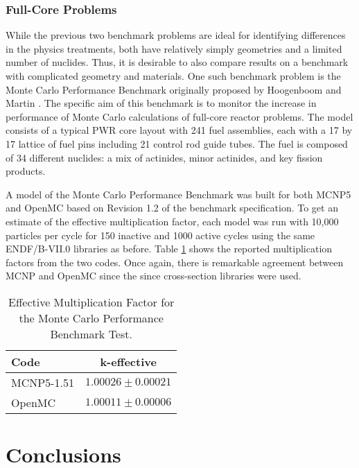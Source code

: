 \documentclass{elsarticle}
\begin{document}
\subsubsection{Full-Core Problems}

While the previous two benchmark problems are ideal for identifying differences
in the physics treatments, both have relatively simply geometries and a limited
number of nuclides. Thus, it is desirable to also compare results on a benchmark
with complicated geometry and materials. One such benchmark problem is the Monte
Carlo Performance Benchmark originally proposed by Hoogenboom and Martin
\cite{hoogenboom}. The specific aim of this benchmark is to monitor the increase
in performance of Monte Carlo calculations of full-core reactor problems. The
model consists of a typical PWR core layout with 241 fuel assemblies, each with
a 17 by 17 lattice of fuel pins including 21 control rod guide tubes. The fuel
is composed of 34 different nuclides: a mix of actinides, minor actinides, and
key fission products.

A model of the Monte Carlo Performance Benchmark was built for both MCNP5 and
OpenMC based on Revision 1.2 of the benchmark specification. To get an estimate
of the effective multiplication factor, each model was run with 10,000 particles
per cycle for 150 inactive and 1000 active cycles using the same ENDF/B-VII.0
libraries as before. Table \ref{tab:hoogenboom} shows the reported
multiplication factors from the two codes. Once again, there is remarkable
agreement between MCNP and OpenMC since the since cross-section libraries were
used.

\begin{table}
  \caption{Effective Multiplication Factor for the Monte Carlo Performance
    Benchmark Test.}
  \label{tab:hoogenboom}
  \begin{center}
  \begin{tabular}{ l c }
    \hline
    Code & k-effective \\
    \hline
    MCNP5-1.51 & $1.00026 \pm 0.00021$ \\
    OpenMC     & $1.00011 \pm 0.00006$ \\
    \hline
  \end{tabular}
  \end{center}
\end{table}

\section{Conclusions}



\end{document}
